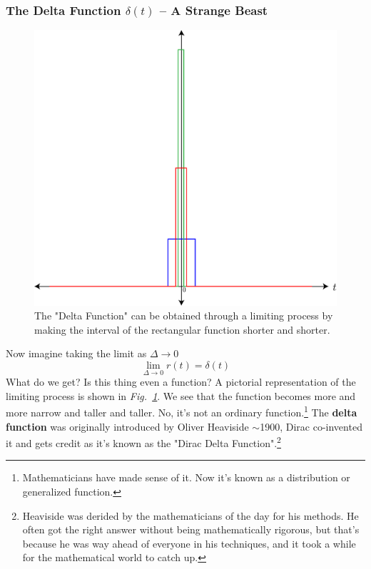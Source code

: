 \subsubsection{The Delta Function $\delta(t)$ -- A Strange Beast}
\begin{figure}[tb]
\centering
\includegraphics[width=.5\columnwidth]{rect_func_delta}
\caption{The "Delta Function" can be obtained through a limiting process by making the interval of the rectangular function shorter and shorter. }
\label{fig:rect_func_delta}
\end{figure}
Now imagine taking the limit as $\Delta\rightarrow 0$
    \begin{equation}
        \lim_{\Delta\rightarrow0}{r\left(t\right)=\delta(t)}
    \end{equation}
What do we get?  Is this thing even a function?  A pictorial representation of the limiting process is shown in \emph{Fig.~\ref{fig:rect_func_delta}}.  We see that the function becomes more and more narrow and taller and taller.
 No, it's not an ordinary function.\footnote{Mathematicians have made sense of it.  Now it's known as a distribution or generalized function.}  The \textbf{delta function} was originally introduced by Oliver Heaviside $\sim$1900, Dirac co-invented it and gets credit as it's known as the "Dirac Delta Function".\footnote{Heaviside was derided by the mathematicians of the day for his methods.  He often got the right answer without being mathematically rigorous, but that's because he was way ahead of everyone in his techniques, and it took a while for the mathematical world to catch up.}
